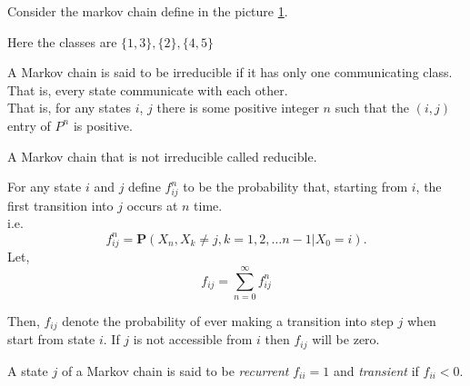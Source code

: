 \begin{example}[]
    Consider the markov chain define in the picture \cref{example of communication}.
\begin{figure}[h]
    \centering
    \caption{}
    \label{example of communication}
\end{figure}

Here the classes are $\{ 1,3 \}, \{2\}, \{4,5\}$
\end{example}

\begin{definition}
    A Markov chain is said to be irreducible if it has only one communicating class. That is, every state communicate with each other.\\ 
    That is, for any states $i$, $j$ there is some positive integer $n$ such that the $(i, j)$ entry of $ P^{n} $ is positive.
\end{definition}

A Markov chain that is not irreducible called reducible.

For any state $ i $ and $ j $ define $ f^{n}_{ij} $ to be the probability that, starting from $ i $, the first transition into $ j  $
occurs at $ n $ time. \\ 
i.e. 
\[
    f^{n}_{ij} = \mathbf{P}(X_{n},X_{k}\neq j, k=1,2,\ldots n-1|X_{0}=i).
\]
Let,
\[
    f_{ij}=\sum_{n=0}^{\infty} f^{n}_{ij}
\]

Then, $ f_{ij} $ denote the probability of ever making a transition into step $ j $ when start from state $ i $. 
If $ j $ is not accessible from $ i $ then $ f_{ij} $ will be zero.

\begin{definition}
    A state $ j $ of a Markov chain is said to be \textit{recurrent}  $ f_{ii}=1 $ and \textit{transient}  if $ f_{ii}<0 $.
\end{definition}

